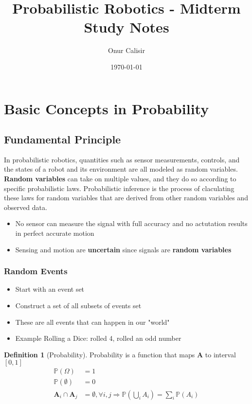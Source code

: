 \documentclass[14pt,letterpaper]{article}
\title{Probabilistic Robotics - Midterm Study Notes}
\author{Onur Calisir}
\date{\today}
\theoremstyle{definition}
\newtheorem{definition}{Definition}[section]
\newcommand{\prob}[1]{\mathbb{P}\left(#1\right)}
\begin{document}
\maketitle
\tableofcontents
\newpage

\section{Basic Concepts in Probability}

\subsection{Fundamental Principle}

In probabilistic robotics, quantities such as sensor measurements, controls, and the states of a robot and its environment are all modeled as random variables.
\textbf{Random variables} can take on multiple values, and they do so according to specific probabilistic laws.
Probabilistic inference is the process of claculating these laws for random variables that are derived from other random variables and observed data.
\begin{itemize}
  \item No sensor can measure the signal with full accuracy and no actutation results in perfect accurate motion
  \item Sensing and motion are \textbf{uncertain} since signals are \textbf{random variables}
\end{itemize}

\subsubsection{Random Events}

\begin{itemize}
  \item Start with an event set
  \item Construct a set of all subsets of events set
  \item These are all events that can happen in our "world"
  \item Example Rolling a Dice: rolled 4, rolled an odd number
\end{itemize}

\begin{definition}[Probability]
  Probability is a function that maps \textbf{A} to interval $[0,1]$
  \begin{align}
    \prob{\Omega} &= 1 \\
    \prob{\emptyset} &= 0 \\
    \textbf{A}_i \cap \textbf{A}_j &= \emptyset, \forall i,j \Rightarrow \prob{\bigcup_{i}A_i} = \sum_{i}{\prob{A_i}}
  \end{align}
\end{definition}
\end{document}
